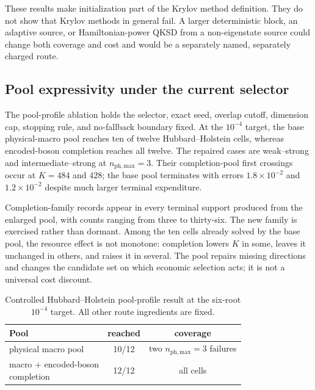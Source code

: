 \documentclass[
  reprint,
  amsmath,
  amssymb,
  aps,
  pra,
  nofootinbib,
  superscriptaddress,
  floatfix
]{revtex4-2}
\newcommand{\phmax}{n_{\mathrm{ph,max}}}
\begin{document}
These results make initialization part of the Krylov method definition.  They
do not show that Krylov methods in general fail.  A larger deterministic
block, an adaptive source, or Hamiltonian-power QKSD from a non-eigenstate
source could change both coverage and cost and would be a separately named,
separately charged route.

\subsection{Pool expressivity under the current selector}
\label{sec:pool_ablation_results}

The pool-profile ablation holds the selector, exact seed, overlap cutoff,
dimension cap, stopping rule, and no-fallback boundary fixed.  At the
$10^{-4}$ target, the base physical-macro pool reaches ten of twelve
Hubbard--Holstein cells, whereas encoded-boson completion reaches all twelve.
The repaired cases are weak--strong and intermediate--strong at
$\phmax=3$.  Their completion-pool first crossings occur at $K=484$ and
$428$; the base pool terminates with errors $1.8\times10^{-2}$ and
$1.2\times10^{-2}$ despite much larger terminal expenditure.

Completion-family records appear in every terminal support produced from the
enlarged pool, with counts ranging from three to thirty-six.  The new family
is exercised rather than dormant.  Among the ten cells already solved by the
base pool, the resource effect is not monotone: completion lowers $K$ in some,
leaves it unchanged in others, and raises it in several.  The pool repairs
missing directions and changes the candidate set on which economic selection
acts; it is not a universal cost discount.

\begin{table}[t]
\caption{Controlled Hubbard--Holstein pool-profile result at the six-root
$10^{-4}$ target.  All other route ingredients are fixed.}
\label{tab:pool_ablation_results}
\centering
\small
\begin{tabular}{@{}lcc@{}}
\toprule
Pool & reached & coverage \\
\midrule
physical macro pool & 10/12 & two $\phmax=3$ failures \\
\shortstack[l]{macro + encoded-boson\\completion} & 12/12 & all cells \\
\bottomrule
\end{tabular}
\end{table}
\end{document}
